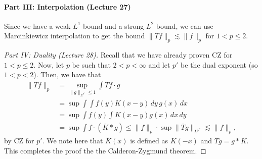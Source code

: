 \paragraph{Part III: Interpolation (Lecture 27)}
Since we have a weak $L^1$ bound and a strong $L^2$ bound, we can use Marcinkiewicz interpolation to get the bound $\|Tf\|_p\lesssim\|f\|_p$ for $1<p\leq2$.
\begin{proof}[Part IV: Duality (Lecture 28)]
Recall that we have already proven CZ for $1<p\leq2$. Now, let $p$ be such that $2<p<\infty$ and let $p'$ be the dual exponent (so $1<p<2$). Then, we have that
\begin{align*}
\|Tf\|_p&=\sup_{\|g\|_{L^{p'}}\leq1}\int Tf\cdot g\\
&=\sup\int\!\int f(y)K(x-y)\,dy\,g(x)\,dx\\
&=\sup\int f(y)\int K(x-y)g(x)\,dx\,dy\\
&=\sup\int f\cdot(\overline K*g)
\leq\|f\|_p\cdot\sup\|\overline T g\|_{L^{p'}}\lesssim\|f\|_p,
\end{align*}
by CZ for $p'$. We note here that $\overline K(x)$ is defined as $K(-x)$ and $\overline T g=g*\overline K$. This completes the proof the the Calderon-Zygmund theorem.
\end{proof}
